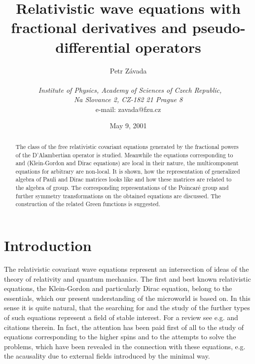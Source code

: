 \documentclass[a4paper,a4paper]{article}
\begin{document}
\author{Petr Z\'avada \\
\\
\ \textit{Institute of Physics, Academy of Sciences of Czech Republic,}\\
\textit{Na Slovance 2, CZ-182 21 Prague 8}\\
e-mail: zavada@fzu.cz}
\date{May 9, 2001}
\title{Relativistic wave equations with fractional derivatives and
pseudo-differential operators}
\maketitle

\begin{abstract}
The class of the free relativistic covariant equations generated by the
fractional powers of the D'Alambertian operator \coordHE{} is studied.
Meanwhile the equations corresponding to \coordHE{} and \coordHE{} (Klein-Gordon and
Dirac equations) are local in their nature, the multicomponent equations for
arbitrary \coordHE{} are non-local. It is shown, how the representation of
generalized algebra of Pauli and Dirac matrices looks like and how these
matrices are related to the algebra of \coordHE{} group. The corresponding
representations of the Poincar\'e group and further symmetry transformations
on the obtained equations are discussed. The construction of the related
Green functions is suggested.
\end{abstract}


\section{Introduction}

The relativistic covariant wave equations represent an intersection of ideas
of the theory of relativity and quantum mechanics. The first and best known
relativistic equations, the Klein-Gordon and particularly Dirac equation,
belong to the essentials, which our present understanding of the microworld
is based on. In this sense it is quite natural, that the searching for and
the study of the further types of such equations represent a field of stable
interest. For a review see e.g. \cite{rev} and citations therein. In fact,
the attention has been paid first of all to the study of equations
corresponding to the higher spins \coordHE{} and to the attempts to solve
the problems, which have been revealed in the connection with these
equations, e.g. the acausality due to external fields introduced by the
minimal way.
\end{document}

